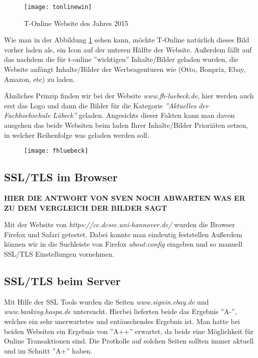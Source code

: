 \documentclass{scrartcl}
\begin{document}
  \begin{figure}
    \texttt{[image: tonlinewin]}
    \caption{T-Online Website des Jahres 2015}
    \label{fig:tonlinewin}
  \end{figure}
  
  Wie man in der Abbildung \ref{fig:tonlinewin} sehen kann, möchte T-Online natürlich dieses Bild vorher laden als, ein Icon auf der unteren Hälfte der Website.
  Außerdem fällt auf das nachdem die für t-online ''wichtigen'' Inhalte/Bilder geladen wurden, die Website anfängt Inhalte/Bilder der Werbeagenturen wie (Otto, Bonprix, Ebay, Amazon, etc) zu laden. 
  
  Ähnliches Prinzip finden wir bei der Website \emph{\textit{www.fh-luebeck.de}}, hier werden auch erst das Logo und dann die Bilder für die Kategorie \textit{''Aktuelles der Fachhochschule Lübeck''} geladen. Angesichts dieser Fakten kann man davon ausgehen das beide Websiten beim laden Ihrer Inhalte/Bilder Prioriäten setzen, in welcher Reihenfolge was geladen werden soll.
  
  \begin{figure}
  \texttt{[image: fhluebeck]}
  \label{fig:fhluebeck}
  \end{figure}
  
  \subsection[Aufgabe 8 SSL/TLS im Browser]{SSL/TLS im Browser}
  
  \textbf{HIER DIE ANTWORT VON SVEN NOCH ABWARTEN WAS ER ZU DEM VERGLEICH DER BILDER SAGT}
  
  Mit der Website von \emph{\textit{https://cc.dcsec.uni-hannover.de/}} wurden die Browser Firefox und Safari getestet. 
  Dabei konnte man eindeutig feststellen
  Außerdem können wir in die Suchleiste von Firefox \textit{about:config} eingeben und so manuell SSL/TLS Einstellungen vornehmen.
  
  \subsection[Aufgabe 9 SSL/TLS beim Server]{SSL/TLS beim Server}
  
  Mit Hilfe der SSL Tools wurden die Seiten \emph{\textit{www.signin.ebay.de}} und \emph{\textit{www.banking.haspa.de}} untersucht. Hierbei lieferten beide das Ergebnis ''A-'', welches ein sehr unerwartetes und entäuschendes Ergebnis ist.
  Man hatte bei beiden Websiten ein Ergebnis von ''A++'' erwartet, da beide eine Möglichkeit für Online Transaktionen sind. Die Protkolle auf solchen Seiten sollten immer aktuell und im Schnitt ''A+'' haben.
  
\end{document}
